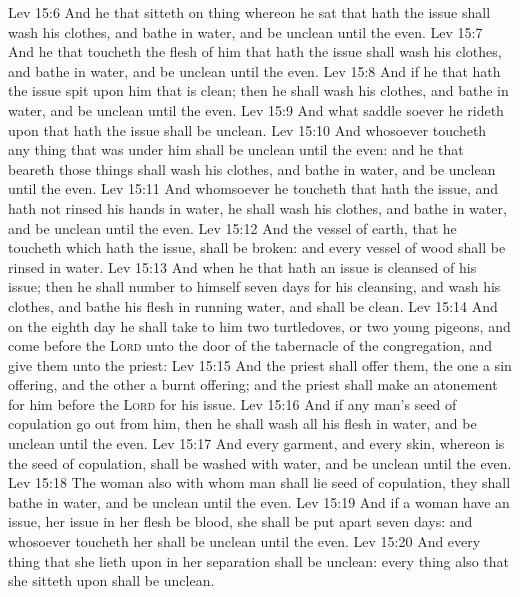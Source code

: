 \vs Lev 15:6 And he that sitteth on  thing whereon he sat that hath the issue shall wash his clothes, and bathe  in water, and be unclean until the even.
\vs Lev 15:7 And he that toucheth the flesh of him that hath the issue shall wash his clothes, and bathe  in water, and be unclean until the even.
\vs Lev 15:8 And if he that hath the issue spit upon him that is clean; then he shall wash his clothes, and bathe  in water, and be unclean until the even.
\vs Lev 15:9 And what saddle soever he rideth upon that hath the issue shall be unclean.
\vs Lev 15:10 And whosoever toucheth any thing that was under him shall be unclean until the even: and he that beareth  those things shall wash his clothes, and bathe  in water, and be unclean until the even.
\vs Lev 15:11 And whomsoever he toucheth that hath the issue, and hath not rinsed his hands in water, he shall wash his clothes, and bathe  in water, and be unclean until the even.
\vs Lev 15:12 And the vessel of earth, that he toucheth which hath the issue, shall be broken: and every vessel of wood shall be rinsed in water.
\vs Lev 15:13 And when he that hath an issue is cleansed of his issue; then he shall number to himself seven days for his cleansing, and wash his clothes, and bathe his flesh in running water, and shall be clean.
\vs Lev 15:14 And on the eighth day he shall take to him two turtledoves, or two young pigeons, and come before the \textsc{Lord} unto the door of the tabernacle of the congregation, and give them unto the priest:
\vs Lev 15:15 And the priest shall offer them, the one  a sin offering, and the other  a burnt offering; and the priest shall make an atonement for him before the \textsc{Lord} for his issue.
\vs Lev 15:16 And if any man's seed of copulation go out from him, then he shall wash all his flesh in water, and be unclean until the even.
\vs Lev 15:17 And every garment, and every skin, whereon is the seed of copulation, shall be washed with water, and be unclean until the even.
\vs Lev 15:18 The woman also with whom man shall lie  seed of copulation, they shall  bathe  in water, and be unclean until the even.
\vs Lev 15:19 And if a woman have an issue,  her issue in her flesh be blood, she shall be put apart seven days: and whosoever toucheth her shall be unclean until the even.
\vs Lev 15:20 And every thing that she lieth upon in her separation shall be unclean: every thing also that she sitteth upon shall be unclean.
